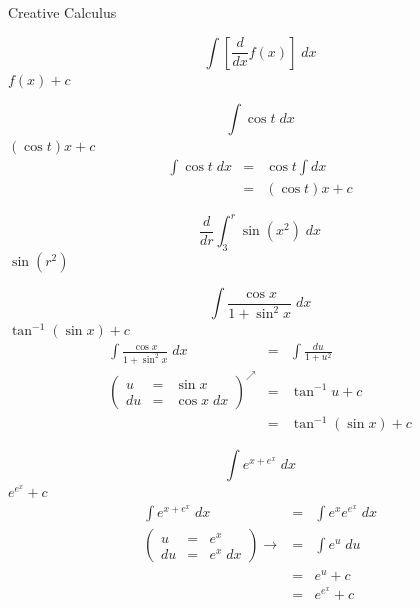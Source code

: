 \documentclass{article}
\begin{document}
\begin{category}{Creative Calculus}

  \begin{clue}
    \[ \int \left[ \frac{d}{dx} f(x) \right] \; dx \]
  \response
    $f(x) + c$
  \end{clue}

  \begin{clue}
    \[ \int \cos t \; dx \]
  \response
    $(\cos t)x + c$
  \solution
    \[
    \begin{array}{rcl}
    {\displaystyle \int \cos t \; dx} & = & {\displaystyle \cos t \int  dx} \\
     & = & {\displaystyle (\cos t)x +   c }
    \end{array}
    \]
  \end{clue}

  \begin{clue}
    \[ \frac{d}{dr} \int_{3}^{r} \sin (x^{2}) \; dx \]
  \response
    $\sin (r^{2})$
  \end{clue}

  \begin{clue}
    \[ \int \frac{\cos x}{1 + \sin^{2} x} \; dx \]
  \response
    $\tan^{-1} (\sin x) + c$
  \solution
    \[
    \begin{array}{rcl}
    {\displaystyle \int \frac{\cos x}{1 + \sin^{2} x} \; dx} & = & {\displaystyle \int \frac{du}{1+u^{2}}} \\
    \left( \begin{array}{rcl}
    u & = & \sin x \\
    du & = & \cos x \; dx
    \end{array} \right)^{\nearrow} & = & {\displaystyle \tan^{-1} u + c} \\
     & = & {\displaystyle \tan^{-1} (\sin x) + c}
    \end{array}
    \]
  \end{clue}

  \begin{clue}
    \[ \int e^{x+e^{x}} \; dx \]
  \response
    $e^{e^{x}} + c$
  \solution
    \[
    \begin{array}{rcl}
    {\displaystyle \int e^{x+e^{x}} \; dx} & = & {\displaystyle \int e^{x}e^{e^{x}} \; dx} \\
    \left( \begin{array}{rcl}
    u & = & e^{x} \\
    du & = & e^{x} \; dx
    \end{array} \right) \rightarrow & = & {\displaystyle \int e^{u} \; du} \\
     & = & {\displaystyle e^{u} + c} \\
     & = & {\displaystyle e^{e^{x}} + c }
    \end{array}
    \]
  \end{clue}

\end{category}
\end{document}
